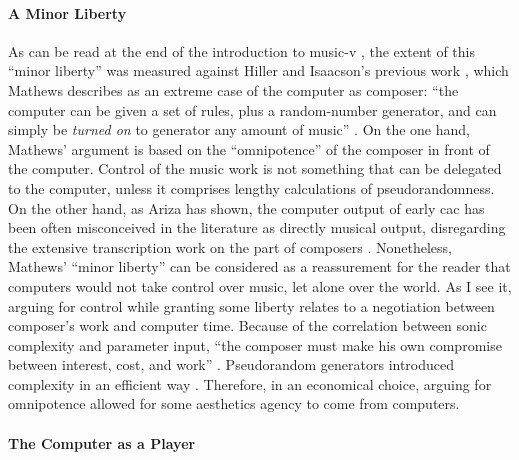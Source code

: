 \paragraph{A Minor Liberty}
As can be read at the end of the introduction to \gls{music-v} \parencite{Mat63:The}, the extent of this ``minor liberty'' was measured against Hiller and Isaacson's previous work \parencite{Hil59:Exp}, which Mathews describes as an extreme case of the computer as composer: ``the computer can be given a set of rules, plus a random-number generator, and can simply be \textit{turned on} to generator any amount of music'' \parencite[557]{Mat63:The}. On the one hand, Mathews' argument is based on the ``omnipotence'' of the composer in front of the computer. Control of the music work is not something that can be delegated to the computer, unless it comprises lengthy calculations of pseudorandomness. On the other hand, as Ariza has shown, the computer output of early \gls{cac} has been often misconceived in the literature as directly musical output, disregarding the extensive transcription work on the part of composers \parencite{Ari05:Ano}. Nonetheless, Mathews' ``minor liberty'' can be considered as a reassurement for the reader that computers would not take control over music, let alone over the world. As I see it, arguing for control while granting some liberty relates to a negotiation between composer's work and computer time. Because of the correlation between sonic complexity and parameter input, ``the composer must make his own compromise between interest, cost, and work'' \parencite[555]{Mat63:The}. Pseudorandom generators introduced complexity in an efficient way \parencite{fdch/papers/spectral}. Therefore, in an economical choice, arguing for omnipotence allowed for some aesthetics agency to come from computers. 

\paragraph{The Computer as a Player}

